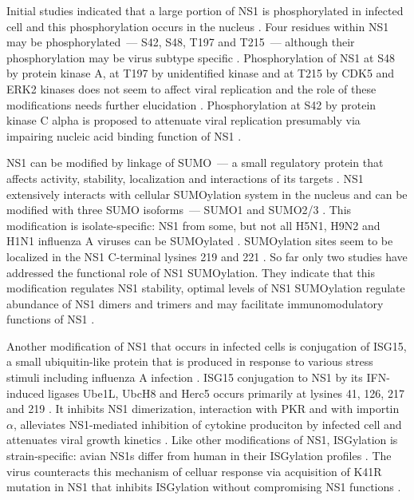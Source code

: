 		Initial studies indicated that a large portion of \gls{NS1} is phosphorylated in infected cell and this phosphorylation occurs in the nucleus \parencite{Privalsky1981}. Four residues within \gls{NS1} may be phosphorylated~--- S42, S48, T197 and T215~--- although their phosphorylation may be virus subtype specific \parencite{Petri1982}. Phosphorylation of \gls{NS1} at S48 by protein kinase A, at T197 by unidentified kinase and at T215 by CDK5 and ERK2 kinases does not seem to affect viral replication and the role of these modifications needs further elucidation \parencite{Hale2009, Hutchinson2012, Hsiang2012}. Phosphorylation at S42 by protein kinase C alpha is proposed to attenuate viral replication presumably via impairing nucleic acid binding function of \gls{NS1} \parencite{Hsiang2012}.
		
		\gls{NS1} can be modified by linkage of \gls{SUMO}~--- a small regulatory protein that affects activity, stability, localization and interactions of its targets \parencite{Johnson2004, Pal2010a}. \gls{NS1} extensively interacts with cellular \gls{SUMO}ylation system in the nucleus and can be modified with three \gls{SUMO} isoforms~--- \gls{SUMO}1 and \gls{SUMO}2/3 \parencite{Pal2011, Santos2013a}. This modification is isolate-specific: \gls{NS1} from some, but not all H5N1, H9N2 and H1N1 influenza A viruses can be \gls{SUMO}ylated \parencite{Xu2011}. \gls{SUMO}ylation sites seem to be localized in the NS1 C-terminal lysines 219 and 221 \parencite{Xu2011}. So far only two studies have addressed the functional role of \gls{NS1} \gls{SUMO}ylation. They indicate that this modification regulates \gls{NS1} stability, optimal levels of \gls{NS1} \gls{SUMO}ylation regulate abundance of \gls{NS1} dimers and trimers and may facilitate immunomodulatory functions of \gls{NS1} \parencite{Xu2011, Santos2013a}. 
		
		Another modification of \gls{NS1} that occurs in infected cells is conjugation of \gls{ISG15}, a small ubiquitin-like protein that is produced in response to various stress stimuli including influenza A infection \parencite{Pitha-Rowe2007, Sadler2008, Hsiang2009}. \gls{ISG15} conjugation to \gls{NS1} by its \gls{IFN}-induced ligases Ube1L, UbcH8 and Herc5 occurs primarily at lysines 41, 126, 217 and 219 \parencite{Zhao2010, Tang2010a}. It inhibits \gls{NS1} dimerization, interaction with \gls{PKR} and with importin $\alpha$, alleviates \gls{NS1}-mediated inhibition of cytokine produciton by infected cell and attenuates viral growth kinetics \parencite{Zhao2010, Tang2010a}. Like other modifications of \gls{NS1}, ISGylation is strain-specific: avian \gls{NS1}s differ from human in their ISGylation profiles \parencite{Tang2010a}. The virus counteracts this mechanism of celluar response via acquisition of K41R mutation in NS1 that inhibits ISGylation without compromising \gls{NS1} functions \parencite{Zhao2013}.
	
